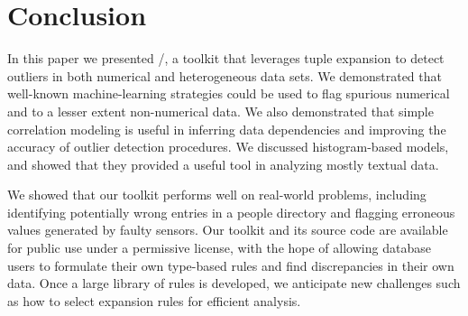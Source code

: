 \section{Conclusion}
\label{sec:conclusion}

In this paper we presented \dBoost/, a toolkit that leverages tuple expansion to detect outliers in both numerical and heterogeneous data sets. We demonstrated that well-known machine-learning strategies could be used to flag spurious numerical and to a lesser extent non-numerical data. We also demonstrated that simple correlation modeling is useful in inferring data dependencies and improving the accuracy of outlier detection procedures. We discussed histogram-based models, and showed that they provided a useful tool in analyzing mostly textual data.

We showed that our toolkit performs well on real-world problems, including identifying potentially wrong entries in a people directory and flagging erroneous values generated by faulty sensors. Our toolkit and its source code are available for public use under a permissive license, with the hope of allowing database users to formulate their own type-based rules and find discrepancies in their own data.
Once a large library of rules is developed, we anticipate new challenges such as how to select expansion rules for efficient analysis.


